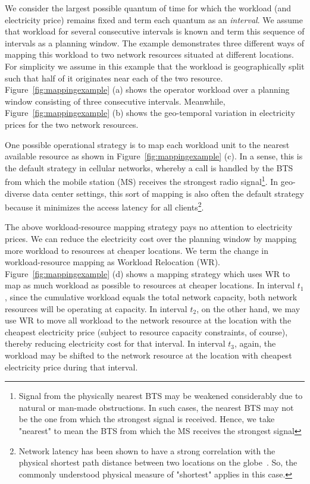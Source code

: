 We consider the largest possible quantum of time for which the workload (and electricity price) remains fixed and term each quantum as an \textit{interval}. We assume that workload for several consecutive intervals is known and term this sequence of intervals as a planning window.   The example demonstrates three different ways of mapping this workload to two network resources situated at different locations. For simplicity we assume in this example that the workload is geographically split such that half of it originates near each of the two resource. Figure~\ref{fig:mappingexample} (a) shows the operator workload over a planning window consisting of three consecutive intervals. Meanwhile, Figure~\ref{fig:mappingexample} (b) shows the geo-temporal variation in electricity prices for the two network resources.


One possible operational strategy is to map each workload unit to the nearest available resource as shown in Figure~\ref{fig:mappingexample} (c). In a sense, this is the default strategy in cellular networks, whereby a call is handled by the BTS from which the mobile station (MS) receives the strongest radio signal\footnote{Signal from the physically nearest BTS may be weakened considerably due to natural or man-made obstructions. In such cases, the nearest BTS may not be the one from which the strongest signal is received. Hence, we take "nearest" to mean the BTS from which the MS receives the strongest signal}. In geo-diverse data center settings, this sort of mapping is also often the default strategy because it minimizes the access latency for all clients\footnote{Network latency has been shown to have a strong correlation with the physical shortest path distance between two locations on the globe~\cite{dina:p2pdelay:infocom:2004}. So, the commonly understood physical measure of "shortest" applies in this case.}. 

The above workload-resource mapping strategy pays no attention to electricity prices. We can reduce the electricity cost over the planning window by mapping more workload to resources at cheaper locations. We term the change in workload-resource mapping as Workload Relocation (WR). Figure~\ref{fig:mappingexample} (d) shows a mapping strategy which uses WR to map as much workload as possible to resources at cheaper locations. In interval $t_1$, since the cumulative workload equals the total network capacity, both network resources will be operating at capacity. In interval $t_2$, on the other hand, we may use WR to move all workload to the network resource at the location with the cheapest electricity price (subject to resource capacity constraints, of course), thereby reducing electricity cost for that interval. In interval $t_3$, again, the workload may be shifted to the network resource at the location with cheapest electricity price during that interval.

